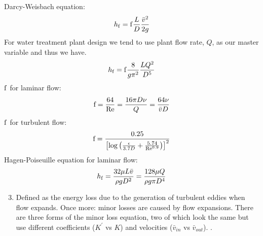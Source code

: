\documentclass[letterpaper,10pt,english]{sphinxmanual}
\begin{document}
Darcy-Weisbach equation:
\begin{equation}\label{equation:Fluids_Review/Fluids_Review_Design:Fluids_Review/Fluids_Review_Design:33}
\begin{split}h_{\rm{f}} = {\rm{f}} \frac{L}{D} \frac{\bar v^2}{2g}\end{split}
\end{equation}
For water treatment plant design we tend to use plant flow rate, \(Q\), as our master variable and thus we have.
\begin{equation}\label{equation:Fluids_Review/Fluids_Review_Design:Fluids_Review/Fluids_Review_Design:34}
\begin{split}h_{\rm{f}} = {\rm{f}} \frac{8}{g \pi^2} \frac{LQ^2}{D^5}\end{split}
\end{equation}
\(\rm{f}\) for laminar flow:
\begin{equation}\label{equation:Fluids_Review/Fluids_Review_Design:Fluids_Review/Fluids_Review_Design:35}
\begin{split}{\rm{f}} = \frac{64}{\rm{Re}} = \frac{16 \pi D \nu}{Q} = \frac{64 \nu}{\bar v D}\end{split}
\end{equation}
\(\rm{f}\) for turbulent flow:
\begin{equation}\label{equation:Fluids_Review/Fluids_Review_Design:Fluids_Review/Fluids_Review_Design:36}
\begin{split}{\rm{f}} = \frac{0.25} {\left[ \log \left( \frac{\epsilon }{3.7D} + \frac{5.74}{{\rm Re}^{0.9}} \right) \right]^2}\end{split}
\end{equation}
Hagen-Poiseuille equation for laminar flow:
\begin{equation}\label{equation:Fluids_Review/Fluids_Review_Design:Fluids_Review/Fluids_Review_Design:37}
\begin{split}h_{\rm{f}} = \frac{32\mu L \bar v}{\rho gD^2} = \frac{128\mu Q}{\rho g\pi D^4}\end{split}
\end{equation}\begin{enumerate}
\setcounter{enumi}{2}
\item {} 
 Defined as the energy loss due to the generation of turbulent eddies when flow expands. Once more: minor losses are caused by flow expansions. There are three forms of the minor loss equation, two of which look the same but use different coefficients (\(K^{'}\) vs \(K\)) and velocities (\(\bar v_{in}\) vs \(\bar v_{out}\)). .

\end{enumerate}
\end{document}
